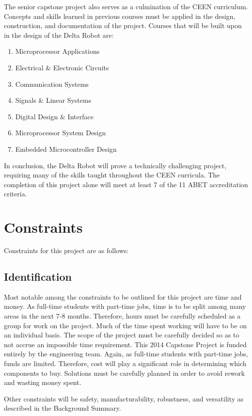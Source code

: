 \documentclass[11pt]{report}
\begin{document}
The senior capstone project also serves as a culmination of the CEEN curriculum. Concepts and skills learned in previous courses must be applied in the design, construction, and documentation of the project.
Courses that will be built upon in the design of the Delta Robot are:
\begin{enumerate} \parskip2pt
	\item Microprocessor Applications
	\item Electrical \& Electronic Circuits
	\item Communication Systems
	\item Signals \& Linear Systems
	\item Digital Design \& Interface
	\item Microprocessor System Design
	\item Embedded Microcontroller Design
\end{enumerate}

In conclusion, the Delta Robot will prove a technically challenging project, requiring many of the skills taught throughout the CEEN curricula.
The completion of this project alone will meet at least 7 of the 11 ABET accreditation criteria.

\section{Constraints}	
Constraints for this project are as follows:

\subsection{Identification}
Most notable among the constraints to be outlined for this project are time and money.
As full-time students with part-time jobs, time is to be split among many areas in the next 7-8 months.
Therefore, hours must be carefully scheduled as a group for work on the project.
Much of the time spent working will have to be on an individual basis.
The scope of the project must be carefully decided so as to not accrue an impossible time requirement. 
This 2014 Capstone Project is funded entirely by the engineering team. 
Again, as full-time students with part-time jobs, funds are limited.
Therefore, cost will play a significant role in determining which components to buy.
Solutions must be carefully planned in order to avoid rework and wasting money spent.

Other constraints will be safety, manufacturability, robustness, and versatility as described in the Background Summary.
\end{document}
